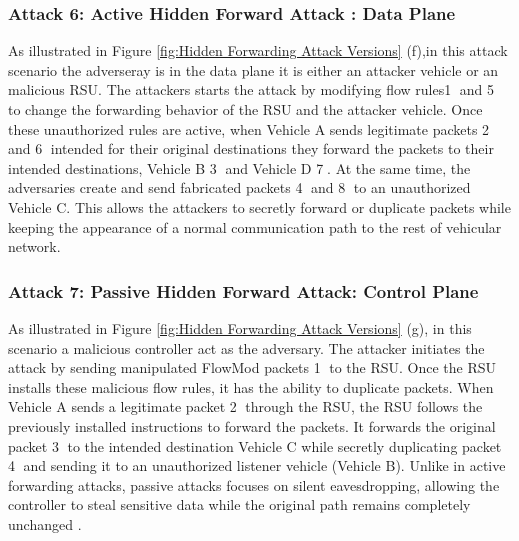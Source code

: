 \documentclass[12pt, a4paper]{report}
\begin{document}
\begin{itemize}
  \subsubsection{Attack 6: Active Hidden Forward Attack : Data Plane}
   As illustrated in Figure \ref{fig:Hidden Forwarding Attack Versions} (f),in this attack scenario the adverseray is in the data plane it is either an attacker vehicle or an malicious RSU. The attackers starts the attack by modifying flow rules\textcircled{1} and \textcircled{5} to change the forwarding behavior of the RSU and the attacker vehicle. Once these unauthorized rules are active, when Vehicle A sends legitimate packets \textcircled{2} and \textcircled{6} intended for their original destinations they forward the packets to their intended destinations, Vehicle B \textcircled{3} and Vehicle D \textcircled{7}. At the same time, the adversaries create and send fabricated packets \textcircled{4} and \textcircled{8} to an unauthorized Vehicle C. This allows the attackers to secretly forward or duplicate packets while keeping the appearance of a normal communication path to the rest of vehicular network.

  \subsubsection{Attack 7: Passive Hidden Forward Attack: Control Plane}
  As illustrated in Figure \ref{fig:Hidden Forwarding Attack Versions} (g), in this scenario a malicious controller act as the adversary. The attacker initiates the attack by sending manipulated FlowMod packets \textcircled{1} to the RSU. Once the RSU installs these malicious flow rules, it has the ability to duplicate packets. When Vehicle A sends a legitimate packet \textcircled{2} through the RSU, the RSU follows the previously installed instructions to forward the packets. It forwards the original packet \textcircled{3} to the intended destination Vehicle C while secretly duplicating packet \textcircled{4} and sending it to an unauthorized listener vehicle (Vehicle B). Unlike in active forwarding attacks, passive attacks focuses on silent eavesdropping, allowing the controller to steal sensitive data while the original path remains completely unchanged \cite{kaur2024vanetsdn}.


\end{itemize}
\end{document}
